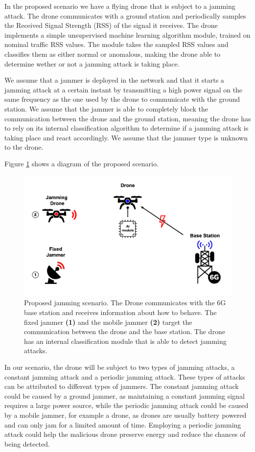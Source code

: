 \documentclass[futureinternet,article,submit,pdftex,moreauthors]{Definitions/mdpi}
\begin{document}
In the proposed scenario we have a flying drone that is subject to a jamming attack. The drone communicates with a ground station and periodically samples the Received Signal Strength (RSS) of the signal it receives. 
The drone implements a simple unsupervised machine learning algorithm module, trained on nominal traffic RSS values. The module takes the sampled RSS values and classifies them as either normal or anomalous, making the drone able to determine wether or not a jamming attack is taking place. 


We assume that a jammer is deployed in the network and that it starts a jamming attack at a certain instant by transmitting a high power signal on the same frequency as the one used by the drone to communicate with the ground station.
We assume that the jammer is able to completely block the communication between the drone and the ground station, meaning the drone has to rely on its internal classification algorithm to determine if a jamming attack is taking place and react accordingly.
We assume that the jammer type is unknown to the drone. 

Figure \ref{fig:CombinedJammingscenariosDiagram} shows a diagram of the proposed scenario. 

\begin{figure}[H]
	\includegraphics[width=10.5 cm]{img/CombinedJammingscenariosDiagram.jpg}
	\caption{Proposed jamming scenario. The Drone communicates with the 6G base station and receives information about how to behave. The fixed jammer \textbf{(1)} and the mobile jammer \textbf{(2)} target the communication between the drone and the base station. The drone has an internal classification module that is able to detect jamming attacks.}
	\label{fig:CombinedJammingscenariosDiagram}
	\end{figure}   
	\unskip


In our scenario, the drone will be subject to two types of jamming attacks, a constant jamming attack and a periodic jamming attack.
These types of attacks can be attributed to different types of jammers. The constant jamming attack could be caused by a ground jammer, as maintaining a constant jamming signal requires a large power source, while 
the periodic jamming attack could be caused by a mobile jammer, for example a drone, as drones are usually battery powered and can only jam for a limited amount of time. 
Employing a periodic jamming attack could help the malicious drone preserve energy and reduce the chances of being detected.
\end{document}
